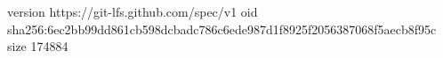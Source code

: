 version https://git-lfs.github.com/spec/v1
oid sha256:6ec2bb99dd861cb598dcbadc786c6ede987d1f8925f2056387068f5aecb8f95c
size 174884
